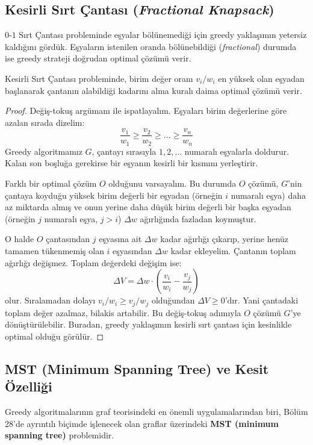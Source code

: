 \subsection{Kesirli Sırt Çantası (\textit{Fractional Knapsack})}

$0$-$1$ Sırt Çantası probleminde eşyalar bölünemediği için greedy yaklaşımın yetersiz kaldığını gördük. Eşyaların istenilen oranda bölünebildiği (\textit{fractional}) durumda ise greedy strateji doğrudan optimal çözümü verir.

\begin{theorem}
Kesirli Sırt Çantası probleminde, birim değer oranı $v_i / w_i$ en yüksek olan eşyadan başlanarak çantanın alabildiği kadarını alma kuralı daima optimal çözümü verir.
\end{theorem}

\begin{proof}
Değiş-tokuş argümanı ile ispatlayalım. Eşyaları birim değerlerine göre azalan sırada dizelim:
\[
\frac{v_1}{w_1} \ge \frac{v_2}{w_2} \ge \dots \ge \frac{v_n}{w_n}
\]
Greedy algoritmamız $G$, çantayı sırasıyla $1, 2, \dots$ numaralı eşyalarla doldurur. Kalan son boşluğa gerekirse bir eşyanın kesirli bir kısmını yerleştirir.

Farklı bir optimal çözüm $O$ olduğunu varsayalım. Bu durumda $O$ çözümü, $G$'nin çantaya koyduğu yüksek birim değerli bir eşyadan (örneğin $i$ numaralı eşya) daha az miktarda almış ve onun yerine daha düşük birim değerli bir başka eşyadan (örneğin $j$ numaralı eşya, $j > i$) $\Delta w$ ağırlığında fazladan koymuştur.

O halde $O$ çantasından $j$ eşyasına ait $\Delta w$ kadar ağırlığı çıkarıp, yerine henüz tamamen tükenmemiş olan $i$ eşyasından $\Delta w$ kadar ekleyelim. Çantanın toplam ağırlığı değişmez. Toplam değerdeki değişim ise:
\[
\Delta V = \Delta w \cdot \left( \frac{v_i}{w_i} - \frac{v_j}{w_j} \right)
\]
olur. Sıralamadan dolayı $v_i / w_i \ge v_j / w_j$ olduğundan $\Delta V \ge 0$'dır. Yani çantadaki toplam değer azalmaz, bilakis artabilir. Bu değiş-tokuş adımıyla $O$ çözümü $G$'ye dönüştürülebilir. Buradan, greedy yaklaşımın kesirli sırt çantası için kesinlikle optimal olduğu görülür.
\end{proof}

\subsection{MST (Minimum Spanning Tree) ve Kesit Özelliği}

Greedy algoritmalarının graf teorisindeki en önemli uygulamalarından biri, Bölüm 28'de ayrıntılı biçimde işlenecek olan graflar üzerindeki \textbf{MST (minimum spanning tree)} problemidir.

